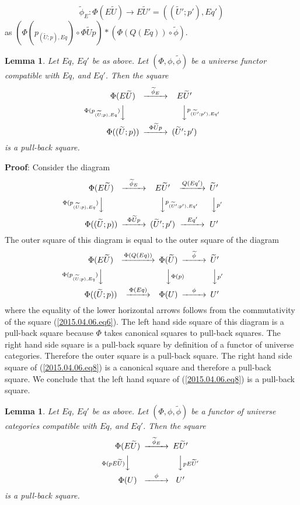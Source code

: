 \documentclass[12pt]{article}
\newenvironment{eq}{\begin{equation}}{\end{equation}}
\newenvironment{myproof}{{\bf Proof}:}{\vskip 5mm }
\newtheorem{lemma}[proposition]{Lemma}
\newcommand{\llabel}[1]{\label{#1}}
\newcommand{\sr}{\rightarrow}
\newcommand{\wt}{\widetilde}
\begin{document}
%
$$\wt{\phi}_{E}:\Phi(E\wt{U})\sr E\wt{U}'=((\wt{U}';p'),Eq')$$
%
as $(\Phi(p_{(\wt{U};p),Eq})\circ \Phi\wt{U}p)*(\Phi(Q(Eq))\circ \wt{\phi})$. 
%
\begin{lemma}
\llabel{2015.04.06.l4}
Let $Eq$, $Eq'$ be as above. Let $(\Phi,\phi,\wt{\phi})$ be a universe functor compatible with $Eq$, and $Eq'$. Then the square
%
$$
\begin{CD}
\Phi(E\wt{U}) @>\wt{\phi}_{E}>> E\wt{U}'\\
@V\Phi(p_{(\wt{U};p),Eq}) VV @VV p_{(\wt{U}';p'),Eq'}V\\
\Phi((\wt{U};p)) @>\Phi\wt{U}p>> (\wt{U}';p')
\end{CD}
$$
%
is a pull-back square.
%
\end{lemma} 
%
\begin{myproof}
Consider the diagram
%
\begin{eq}\llabel{2015.04.06.eq8}
\begin{CD}
\Phi(E\wt{U}) @>\wt{\phi}_{E}>> E\wt{U}' @>Q(Eq')>> \wt{U}'\\
@V\Phi(p_{(\wt{U};p),Eq}) VV @VV p_{(\wt{U}';p'),Eq'}V @VVp'V\\
\Phi((\wt{U};p)) @>\Phi\wt{U}p>> (\wt{U}';p') @>Eq'>> U'
\end{CD}
\end{eq}
%
The outer square of this diagram is equal to the outer square of the diagram
%
\begin{eq}\llabel{2015.04.06.eq7}
\begin{CD}
\Phi(E\wt{U}) @>\Phi(Q(Eq))>> \Phi(\wt{U}) @>\wt{\phi}>> \wt{U}'\\
@V\Phi(p_{(\wt{U};p),Eq}) VV @VV \Phi(p)V @VVp'V\\
\Phi((\wt{U};p)) @>\Phi(Eq)>> \Phi(U) @>\phi>> U'
\end{CD}
\end{eq}
%
where the equality of the lower horizontal arrows follows from the commutativity of the square (\ref{2015.04.06.eq6}). The left hand side square of this diagram is a pull-back square because $\Phi$ takes canonical squares to pull-back squares. The right hand side square is a pull-back square by definition of a functor of universe categories. Therefore the outer square is a pull-back square. The right hand side square of (\ref{2015.04.06.eq8}) is a canonical square and therefore a pull-back square. We conclude that the left hand square of (\ref{2015.04.06.eq8}) is a pull-back square.
\end{myproof}
%
\begin{lemma}
\llabel{2015.04.06.l6}
Let $Eq$, $Eq'$ be as above. Let $(\Phi,\phi,\wt{\phi})$ be a functor of universe categories compatible with $Eq$, and $Eq'$. Then the square
%
\begin{eq}\llabel{2015.04.06.eq9}
\begin{CD}
\Phi(E\wt{U}) @>\wt{\phi}_{E}>> E\wt{U}'\\
@V\Phi(pE\wt{U})VV @VV pE\wt{U}' V\\
\Phi(U) @>\phi>> U'
\end{CD}
\end{eq}
%
is a pull-back square.
%
\end{lemma} 
\end{document}
